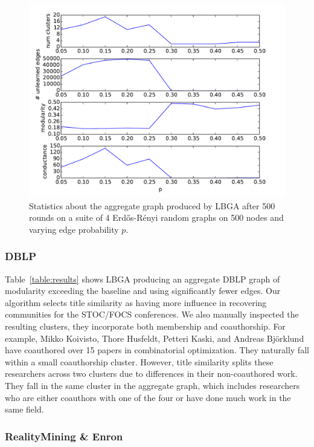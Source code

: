 \documentclass{article}
\newcommand{\er}{Erd\H{o}s-R\'{e}nyi }
\begin{document}
\begin{figure}[t]
\begin{centering}
\includegraphics[width=\columnwidth]{figures/er-consistentNO-varying-p.pdf}
\par\end{centering}
\caption{Statistics about the aggregate graph produced by LBGA after 500 rounds
on a suite of 4 \er random graphs on 500 nodes and varying edge probability
$p$.} 
\label{fig:erpvaries}
\end{figure}

\subsubsection{DBLP} 
Table~\ref{table:results} shows LBGA producing an aggregate DBLP graph of
modularity exceeding the baseline and using significantly fewer edges. Our
algorithm selects title similarity as having more influence in recovering
communities for the STOC/FOCS conferences. We also manually inspected the
resulting clusters, they incorporate both membership and coauthorship. For
example, Mikko Koivisto, Thore Husfeldt, Petteri Kaski, and Andreas
Bj\"{o}rklund have coauthored over 15 papers in combinatorial optimization.
They naturally fall within a small coauthorship cluster.  However, title
similarity splits these researchers across two clusters due to differences in
their non-coauthored work. They fall in the same cluster in the aggregate
graph, which includes researchers who are either coauthors with one of the four
or have done much work in the same field. 


\subsubsection{RealityMining \& Enron} \label{sec:enron-results}
\end{document}
